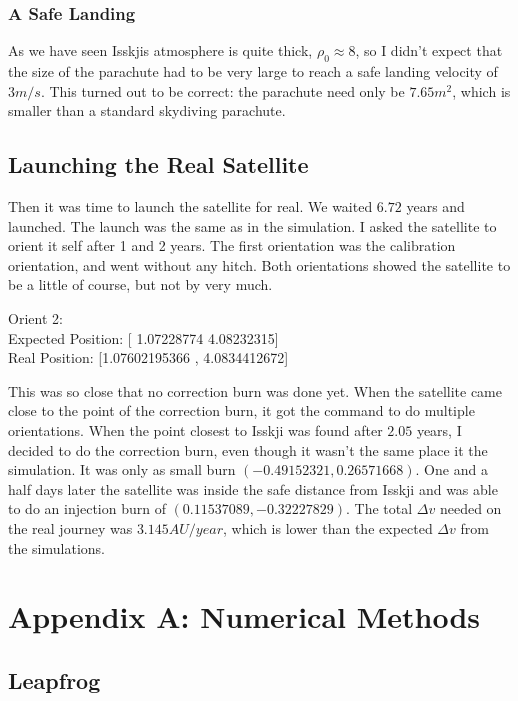 \documentclass[a4paper, 10pt]{article}
\begin{document}
\subsubsection{A Safe Landing}
As we have seen Isskjis atmosphere is quite thick, $\rho_0 \approx 8$, so I didn't expect that the size of the parachute had to be very large to reach a safe landing velocity of $3m/s$. This turned out to be correct: the parachute need only be  $7.65 m^2$, which is smaller than a standard skydiving parachute.


\subsection{Launching the Real Satellite} 
Then it was time to launch the satellite for real. We waited $6.72$ years and launched. The launch was the same as in the simulation. I asked the satellite to orient it self after 1 and 2 years. The first orientation was the calibration orientation, and went without any hitch. Both orientations showed the satellite to be a little of course, but not by very much. 

\begin{tcolorbox}
Orient 2:\\
Expected Position: [ 1.07228774  4.08232315]\\
Real Position: [1.07602195366 , 4.0834412672]
\end{tcolorbox}

This was so close that no correction burn was done yet. When the satellite came close to the point of the correction burn, it got the command to do multiple orientations. When the point closest to Isskji was found after $2.05$ years, I decided to do the correction burn, even though it wasn't the same place it the simulation. It was only as small burn $(-0.49152321, 0.26571668)$. One and a half days later the satellite was inside the safe distance from Isskji and was able to do an injection burn of $(0.11537089, -0.32227829)$. The total $\Delta v$ needed on the real journey was $3.145 AU/year$, which is lower than the expected $\Delta v$ from the simulations.\\





\section{Appendix A: Numerical Methods}
\subsection{Leapfrog}\label{sec:leap}
\end{document}
